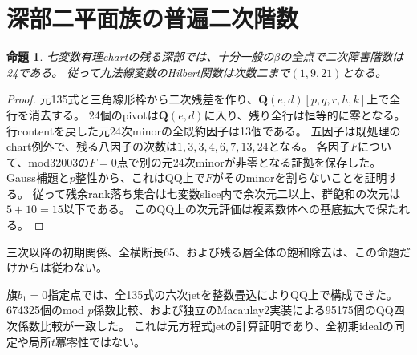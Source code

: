 \documentclass[11pt,a4paper]{ltjsarticle}
\newcommand{\QQ}{\mathbf Q}
\newtheorem{proposition}[theorem]{命題}
\theoremstyle{remark}
\begin{document}
\section{深部二平面族の普遍二次階数}
\begin{proposition}
七変数有理chartの残る深部では、十分一般の$\beta$の全点で二次障害階数は24である。
従って九法線変数のHilbert関数は次数二まで$(1,9,21)$となる。
\end{proposition}
\begin{proof}
元135式と三角線形枠から二次残差を作り、$\QQ(e,d)[p,q,r,h,k]$上で全行を消去する。
24個のpivotは$\QQ(e,d)$に入り、残り全行は恒等的に零となる。
行contentを戻した元24次minorの全既約因子は13個である。
五因子は既処理のchart例外で、残る八因子の次数は$1,3,3,4,6,7,13,24$となる。
各因子$F$について、mod32003の$F=0$点で別の元24次minorが非零となる証拠を保存した。
Gauss補題と$p$整性から、これはQQ上で$F$がそのminorを割らないことを証明する。
従って残余rank落ち集合は七変数slice内で余次元二以上、群飽和の次元は$5+10=15$以下である。
このQQ上の次元評価は複素数体への基底拡大で保たれる\cite{binary-quad-v43}。
\end{proof}
三次以降の初期関係、全横断長65、および残る層全体の飽和除去は、この命題だけからは従わない。

旗$b_1=0$指定点では、全135式の六次jetを整数畳込によりQQ上で構成できた。
674325個のmod $p$係数比較、および独立のMacaulay2実装による95175個のQQ四次係数比較が一致した。
これは元方程式jetの計算証明であり、全初期idealの同定や局所$t$冪零性ではない\cite{flag-exact-jets-v43}。
\end{document}

